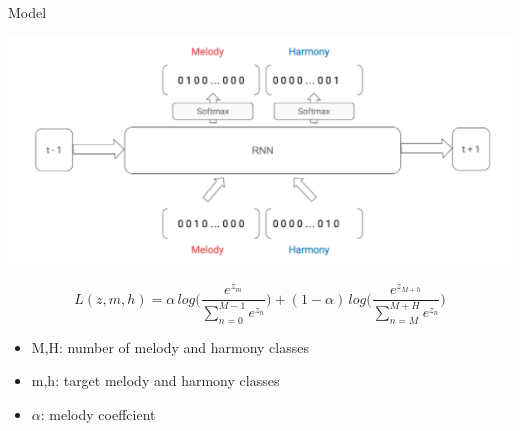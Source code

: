 \documentclass{beamer}
\begin{document}
\begin{frame}{Model}
	\begin{center}
	\includegraphics[scale=0.4]{baseline_model}
	\end{center}
\small \[L(z, m, h) =  \alpha \, log \bigg( \frac{ e^{z_m} }{ \sum_{n=0}^{M-1}{ e^{z_n}}} \bigg) + (1 - \alpha) \, log \bigg( \frac{ e^{z_{M+h}} }{ \sum_{n=M}^{M+H}{ e^{z_n}}} \bigg)\]
\begin{itemize}
	\item
	\small M,H: number of melody and  harmony classes
	\item
	\small m,h: target melody and harmony classes
	\item 
	\small $\alpha$: melody coeffcient 
\end{itemize}
\end{frame}
\end{document}
